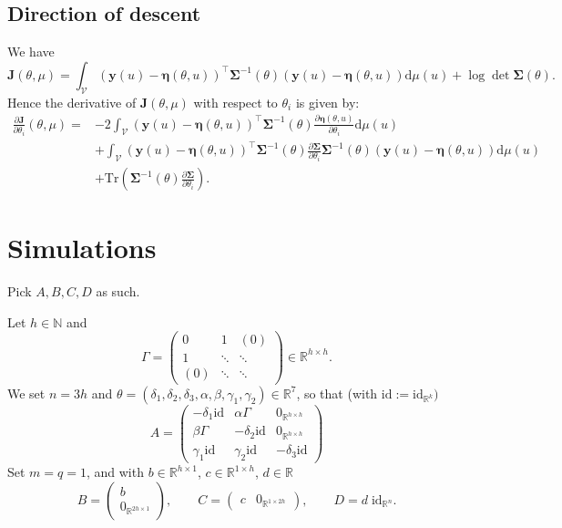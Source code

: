 \documentclass[a4paper]{article}
\theoremstyle{definition}
\theoremstyle{remark}
\newcommand{\R}{\mathbb{R}}
\newcommand{\N}{\mathbb{N}}
\newcommand{\diff}{\mathrm{d}}
\newcommand{\id}{\mathrm{id}}
\newcommand{\Tr}{\mathrm{Tr}}
\newcommand{\V}{\mathcal{V}}
\newcommand{\yb}{\mathbf{y}}
\newcommand{\Jb}{\mathbf{J}}
\newcommand{\etab}{\boldsymbol{\eta}}
\newcommand{\Sigmab}{\boldsymbol{\Sigma}}
\begin{document}
\subsection{Direction of descent}
We have
\begin{equation}
\Jb(\theta,\mu)
=
\int_\V
(\yb(u)-\etab(\theta,u))^\top 
\Sigmab^{-1}(\theta)
(\yb(u)-\etab(\theta,u))\diff \mu(u)+\log\det \Sigmab(\theta).
\end{equation}
Hence the derivative of $\Jb(\theta,\mu)$ with respect to $\theta_i$ is given by:
\begin{equation}\label{E:dJdtheta_i}
\begin{aligned}
\frac{\partial \Jb}{\partial\theta_i}(\theta,\mu)
=&
-2\int_\V
(\yb(u)-\etab(\theta,u))^\top 
\Sigmab^{-1}(\theta)
\frac{\partial\etab(\theta,u)}{\partial \theta_i}\diff \mu(u)
\\
&+
\int_\V
(\yb(u)-\etab(\theta,u))^\top 
\Sigmab^{-1}(\theta) \frac{\partial \Sigmab}{\partial\theta_i}\Sigmab^{-1}(\theta)
(\yb(u)-\etab(\theta,u))\diff \mu(u)
\\&
+
\Tr\left(\Sigmab^{-1}(\theta) \frac{\partial \Sigmab}{\partial\theta_i}\right).
\end{aligned}
\end{equation}

\section{Simulations}

Pick $A,B,C,D$ as such.

Let $h\in \N$ and 
$$
\Gamma = 
\begin{pmatrix}
0 & 1 &(0)
\\
1 & \ddots & \ddots
\\
(0)& \ddots&\ddots
\end{pmatrix}\in \R^{h\times h}.
$$
We set $n=3h$ and $\theta = (\delta_1,\delta_2,\delta_3,\alpha,\beta,\gamma_1,\gamma_2)\in \R^7$, so that (with $\id:=\id_{\R^{k}})$
$$
A=
\begin{pmatrix}
-\delta_1 \id & \alpha \Gamma & 0_{\R^{h\times h}}
\\
\beta \Gamma & -\delta_2 \id & 0_{\R^{h\times h}}
\\
\gamma_1 \id & \gamma_2 \id & -\delta_3 \id
\end{pmatrix}
$$
Set $m=q=1$, and with $b\in \R^{h\times 1}$, $c\in \R^{1\times h}$, $d\in \R$
$$
B=
\begin{pmatrix}
b
\\
0_{\R^{2h\times 1}}
\end{pmatrix},\qquad
C
=
\begin{pmatrix}
c
&
0_{\R^{1\times 2h}}
\end{pmatrix},
\qquad D= d \; \id_{\R^n}.
$$
\end{document}

